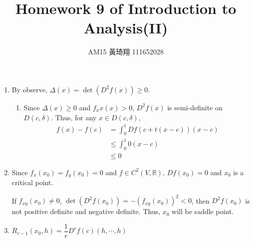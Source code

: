 \documentclass[12pt]{article}
\title{Homework 9 of Introduction to Analysis(II)}
\author{AM15 黃琦翔 111652028}
\begin{document}
\maketitle
\begin{enumerate}
    \item By observe, $\Delta(x) = \det(D^2f(x))\geq 0$.
    \begin{enumerate}
        \item Since $\Delta(x) \geq 0$ and $f_xx(x) > 0$, $D^2f(x)$ is semi-definite on $D(c, \delta)$.
        Thus, for any $x \in D(c, \delta)$, \begin{align*}
            f(x) - f(c) &= \int_{0}^1 Df(c + t(x-c))(x-c)\\
            &\leq \int_{0}^{1} 0(x-c)\\
            &\leq 0
        \end{align*}

        

    \end{enumerate}

    \item Since $f_x(x_0) = f_y(x_0) = 0$ and $f \in C^2(V, \mathbb{R})$, $Df(x_0) = 0$ and $x_0$ is a critical point.
    
    If $f_{xy}(x_0)\neq 0$, $\det(D^2f(x_0)) = - (f_{xy}(x_0))^2 < 0$, then $D^2f(x_0)$ is not positive definite and negative definite.
    Thus, $x_0$ will be saddle point.

    \item $R_{r-1}(x_0, h) = \dfrac{1}{r}D^rf(c)(h, \cdots, h)$
\end{enumerate}
\end{document}
